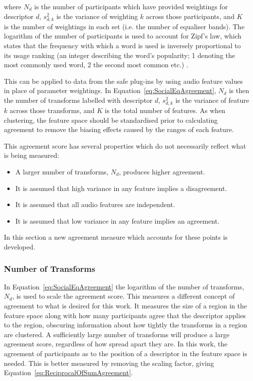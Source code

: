 		where $N_{d}$ is the number of participants which have provided weightings for descriptor $d$,
		$s_{d,k}^{2}$ is the variance of weighting $k$ across those participants, and $K$ is the number of
		weightings in each set (i.e. the number of equaliser bands). The logarithm of the number of
		participants is used to account for Zipf's law, which states that the frequency with which a word is used
		is inversely proportional to its usage ranking (an integer describing the word's popularity; 1 denoting the
		most commonly used word, 2 the second most common etc.) \citep{manning1999foundations}.

		This can be applied to data from the \acrshort{safe} plug-ins by using audio feature values in place of
		parameter weightings. In Equation~\ref{eq:SocialEqAgreement}, $N_{d}$ is then the number of transforms
		labelled with descriptor $d$, $s_{d,k}^{2}$ is the variance of feature $k$ across those transforms, and $K$
		is the total number of features. As when clustering, the feature space should be standardised prior to
		calculating agreement to remove the biasing effects caused by the ranges of each feature.

		This agreement score has several properties which do not necessarily reflect what is being measured:

		\begin{itemize}
			\item A larger number of transforms, $N_{d}$, produces higher agreement.
			\item It is assumed that high variance in any feature implies a disagreement. 
			\item It is assumed that all audio features are independent. 
			\item It is assumed that low variance in any feature implies an agreement. 
		\end{itemize}

		In this section a new agreement measure which accounts for these points is developed.

		\subsubsection*{Number of Transforms}
			In Equation~\ref{eq:SocialEqAgreement} the logarithm of the number of transforms, $N_{d}$, is used
			to scale the agreement score. This measures a different concept of agreement to what is desired for
			this work. It measures the size of a region in the feature space along with how many participants
			agree that the descriptor applies to the region, obscuring information about how tightly the
			transforms in a region are clustered. A sufficiently large number of transforms will produce a
			large agreement score, regardless of how spread apart they are. In this work, the agreement of
			participants as to the position of a descriptor in the feature space is needed. This is better
			measured by removing the scaling factor, giving Equation~\ref{eq:ReciprocalOfSumAgreement}.

